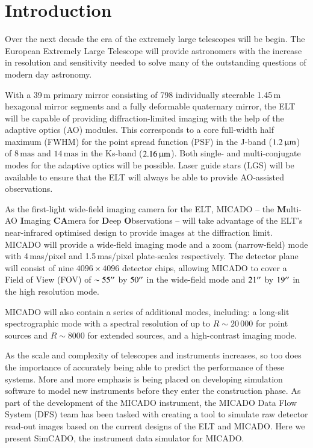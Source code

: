 \section{Introduction}
\label{sec:Introduction}

Over the next decade the era of the extremely large telescopes will be begin.
The European Extremely Large Telescope \citep[ELT, ][]{eelt} will provide astronomers with the increase in resolution and sensitivity needed to solve many of the outstanding questions of modern day astronomy. 

With a 39\,m primary mirror consisting of 798 individually steerable 1.45\,m hexagonal mirror segments and a fully deformable quaternary mirror, the ELT will be capable of providing diffraction-limited imaging with the help of the adaptive optics (AO) modules.
This corresponds to a core full-width half maximum (FWHM) for the point spread function (PSF) in the J-band ($1.2\,\upmu\mathrm{m}$) of $8\,\mathrm{mas}$ and $14\,\mathrm{mas}$ in the Ks-band ($2.16\,\upmu\mathrm{m}$).
Both single- and multi-conjugate modes for the adaptive optics will be possible.
Laser guide stars (LGS) will be available to ensure that the ELT will always be able to provide AO-assisted observations. 

As the first-light wide-field imaging camera for the ELT, MICADO -- the \textbf{M}ulti-AO \textbf{I}maging \textbf{CA}mera for \textbf{D}eep \textbf{O}bservations \citep{micado} -- will take advantage of the ELT's near-infrared optimised design to provide images at the diffraction limit.
MICADO will provide a wide-field imaging mode and a zoom (narrow-field) mode with 4\,mas/pixel and 1.5\,mas/pixel plate-scales respectively.
The detector plane will consist of nine $4096\times 4096$ detector chips, allowing MICADO to cover a Field of View (FOV) of $\sim55^{\prime\prime}$ by $50^{\prime\prime}$ in the wide-field mode and $21^{\prime\prime}$ by $19^{\prime\prime}$ in the high resolution mode.

MICADO will also contain a series of additional modes, including: a long-slit spectrographic mode with a spectral resolution of up to $R\sim20\,000$ for point sources and $R\sim8000$ for extended sources, and a high-contrast imaging mode.

As the scale and complexity of telescopes and instruments increases, so too does the importance of accurately being able to predict the performance of these systems.
More and more emphasis is being placed on developing simulation software to model new instruments before they enter the construction phase.
As part of the development of the MICADO instrument, the MICADO Data Flow System (DFS) team has been tasked with creating a tool to simulate raw detector read-out images based on the current designs of the ELT and MICADO.
Here we present SimCADO, the instrument data simulator for MICADO. 

